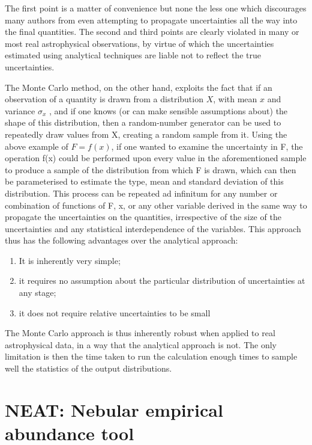 \documentclass[useAMS,usenatbib]{mn2e}
\begin{document}
The first point is a matter of convenience but none the less one which discourages many authors from even attempting to propagate uncertainties all the way into the final quantities.  The second and third points are clearly violated in many or most real astrophysical observations, by virtue of which the uncertainties estimated using analytical techniques are liable not to reflect the true uncertainties.

The Monte Carlo method, on the other hand, exploits the fact that if an observation of a quantity is drawn from a distribution $X$, with mean $x$ and variance $\sigma_x$ , and if one knows (or can make sensible assumptions about) the shape of this distribution, then a random-number generator can be used to repeatedly draw values from X, creating a random sample from it. Using the above example of $F = f (x)$, if one wanted to examine the uncertainty in F, the operation f(x) could be performed upon every value in the aforementioned sample to produce a sample of the distribution from which F is drawn, which can then be parameterised to estimate the type, mean and standard deviation of this distribution. This process can be repeated ad infinitum for any number or combination of functions of F, x, or any other variable derived in the same way to propagate the uncertainties on the quantities, irrespective of the size of the uncertainties and any statistical interdependence of the variables.  This approach thus has the following advantages over the analytical approach:

\begin{enumerate}
  \item It is inherently very simple;
  \item it requires no assumption about the particular distribution of uncertainties at any stage;
  \item it does not require relative uncertainties to be small
\end{enumerate}

The Monte Carlo approach is thus inherently robust when applied to real astrophysical data, in a way that the analytical approach is not.  The only limitation is then the time taken to run the calculation enough times to sample well the statistics of the output distributions.

\section{NEAT: Nebular empirical abundance tool}
\end{document}
